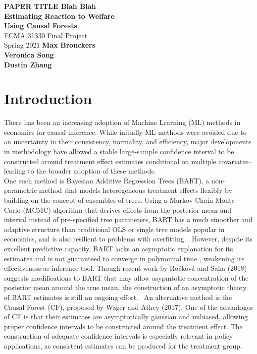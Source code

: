 \documentclass[12pt]{article}
\begin{document}
\begin{titlepage}
    \begin{center}
        \vspace*{1cm}
        \LARGE
        \textbf{PAPER TITLE Blah Blah\\ Estimating Reaction to Welfare\\ Using Causal Forests\\}
        \vspace{0.5cm}
        \Large
        ECMA 31330 Final Project \\ 
        \vspace{0.8cm}
        \large
        Spring 2021
        \vfill
        \vspace{5cm}
        \textbf{Max Bronckers \\ Veronica Song \\ Dustin Zhang}
    \end{center}
\end{titlepage}


\section{Introduction} 
There has been an increasing adoption of Machine Learning (ML) methods in
economics for causal inference. While initially ML methods were avoided due to
an uncertainty in their consistency, normality, and efficiency, major developments in
methodology have allowed a stable large-sample confidence interval to be
constructed around treatment effect estimates conditional on multiple
covariates--leading to the broader adoption of these methods.~\cite{athey2019ML} \\

One such method is Bayesian Additive Regression Trees (BART), a non-parametric
method that models heterogeneous treatment effects flexibly by building on the
concept of ensembles of trees. Using a Markov Chain Monte Carlo (MCMC) algorithm
that derives effects from the posterior mean and interval instead of
pre-specified tree parameters, BART has a much smoother and adaptive structure
than traditional OLS or single tree models popular in economics, and is also
resilient to problems with overfitting.~\cite{greenkern2012} However, despite its
excellent predictive capacity, BART lacks an asymptotic explanation for its
estimates and is not guaranteed to converge in polynomial time
\cite{atheywager2019}, weakening its effectiveness as inference tool. Though
recent work by Ročková and Saha (2018) suggests modifications to BART that may
allow asypmtotic concentration of the posterior mean around the true mean, the
construction of an asymptotic theory of BART estimates is still an ongoing
effort.~\cite{rockova2018theory} An alternative method is the Causal Forest (CF),
proposed by Wager and Athey (2017). One of the advantages of CF is that their
estimates are asymptotically gaussian and unbiased, allowing proper confidence
intervals to be constructed around the treatment effect. The construction of
adequate confidence intervals is especially relevant in policy applications, as
consistent estimates can be produced for the treatment group.~\cite{atheywager2019} \\ 
\end{document}

